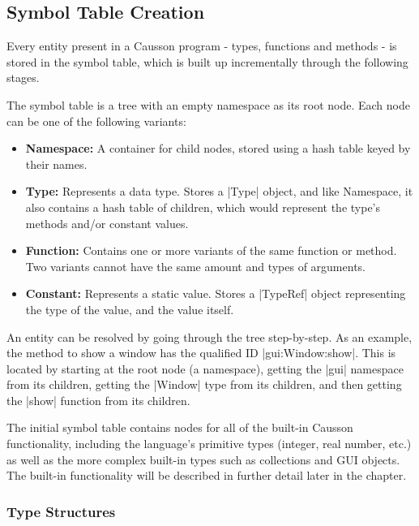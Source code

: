 \documentclass[11pt]{report}
\begin{document}
\subsection{Symbol Table Creation}

Every entity present in a Causson program - types, functions and methods - is stored in the symbol table, which is built up incrementally through the following stages.

The symbol table is a tree with an empty namespace as its root node. Each node can be one of the following variants:

\begin{itemize}
    \item \textbf{Namespace:} A container for child nodes, stored using a hash table keyed by their names.
    
    \item \textbf{Type:} Represents a data type. Stores a |Type| object, and like Namespace, it also contains a hash table of children, which would represent the type's methods and/or constant values.
    
    \item \textbf{Function:} Contains one or more variants of the same function or method. Two variants cannot have the same amount and types of arguments.
    
    \item \textbf{Constant:} Represents a static value. Stores a |TypeRef| object representing the type of the value, and the value itself.
\end{itemize}

An entity can be resolved by going through the tree step-by-step. As an example, the method to show a window has the qualified ID |gui:Window:show|. This is located by starting at the root node (a namespace), getting the |gui| namespace from its children, getting the |Window| type from its children, and then getting the |show| function from its children.

The initial symbol table contains nodes for all of the built-in Causson functionality, including the language's primitive types (integer, real number, etc.) as well as the more complex built-in types such as collections and GUI objects. The built-in functionality will be described in further detail later in the chapter.

\subsubsection{Type Structures}
\end{document}
